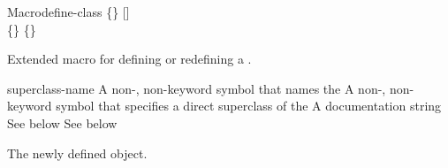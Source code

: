 \documentclass[10pt,twoside,english,pdftex]{article}
\begin{document}
\begin{functiondoc}{Macro}{define-class}{ 
   \code{(}\{\}\superstar\code{)}
   [] \\
   \code{(}\{\}\superstar\code{)}
   \{\}\superstar{} \returns{}
   }
%
%
%

\fnsyntax

\fnpurpose Extended macro for defining or redefining a .

\fnpackage {}

\fnmodule {}

\fnargs
\begin{args}{superclass-name}
 A non-\nil, non-keyword symbol that names the
 A non-\nil, non-keyword symbol that specifies a
direct superclass of the    
\arg[documentation] A documentation string
 See below
 See below
\end{args}

\fnreturns The newly defined  object.


\end{functiondoc}
\end{document}
